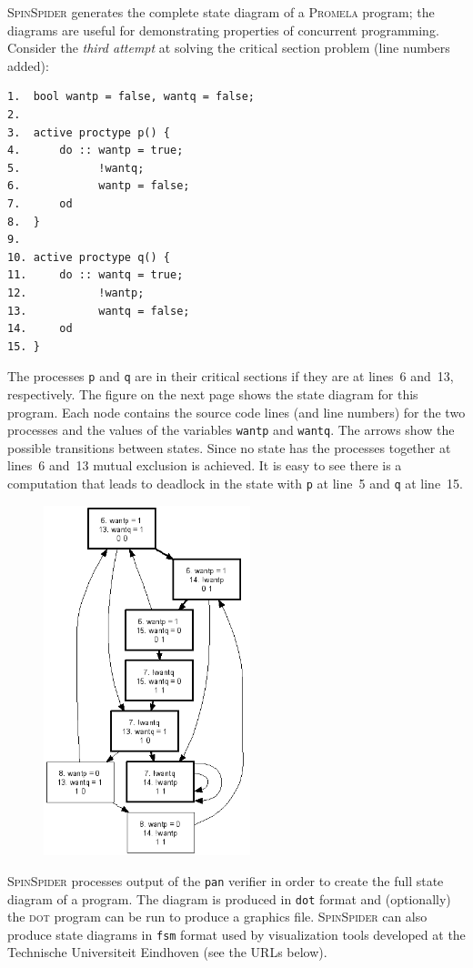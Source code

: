 \documentclass[11pt]{article}
\newcommand{\prm}{\textsc{Promela}}
\newcommand{\spd}{\textsc{SpinSpider}}
\newcommand{\dt}{\textsc{dot}}
\newcommand{\dtf}{\texttt{dot}}
\newcommand{\fsm}{\texttt{fsm}}
\newcommand{\p}[1]{\texttt{#1}}
\begin{document}
\spd{} generates the complete state diagram of a \prm{} program; the 
diagrams are useful for demonstrating properties of concurrent programming.
Consider the \emph{third attempt} at solving the critical section problem (line
numbers added):
\begin{verbatim}
1.  bool wantp = false, wantq = false;
2.  
3.  active proctype p() {
4.      do :: wantp = true; 
5.            !wantq;
6.            wantp = false;
7.      od
8.  }
9.
10. active proctype q() {
11.     do :: wantq = true;
12.           !wantp;
13.           wantq = false;
14.     od
15. }
\end{verbatim}
The processes \p{p} and \p{q} are in their critical sections if they are at 
lines~6 and~13, respectively. The figure on the next page shows the state 
diagram for this program. Each node contains the source code lines (and line 
numbers) for the two processes and the values of the variables \p{wantp} and 
\p{wantq}. The arrows show the possible transitions between states. Since no 
state has the processes together at lines~6 and~13 mutual exclusion is 
achieved. It is easy to see there is a computation that leads to deadlock in 
the state with \p{p} at line~5 and \p{q} at line~15.
\begin{figure}[!htb]
\begin{center}
\includegraphics[width=6cm,keepaspectratio=true]{third.png}
\end{center}
\end{figure}

\spd{} processes output of the \p{pan} verifier in order to create the full 
state diagram of a program. The diagram is produced in \dtf{} format and 
(optionally) the \dt{} program can be run to produce a graphics file.
\spd{} can also produce state diagrams in \fsm{} format used by visualization 
tools developed at the Technische Universiteit Eindhoven (see the URLs below).
\end{document}
